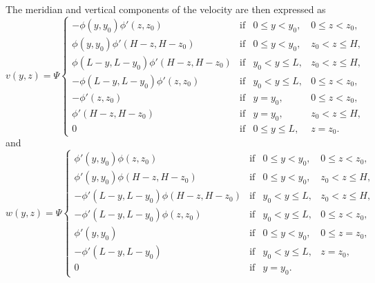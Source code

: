 The meridian and vertical components of the velocity are then expressed as
\begin{equation} \label{eq:v_overturner}
	v(y,z) = \Psi\left\{ 
		\begin{array}{lrrr}
			- \phi(y,y_0)\phi'(z,z_0) & \mbox{if} & 0 \le y < y_0, & 0 \le z < z_0,\\
			\phi(y,y_0)\phi'(H-z,H-z_0) & \mbox{if} & 0 \le y < y_0, & z_0 < z \le H,\\
			\phi(L-y,L-y_0)\phi'(H-z,H-z_0) & \mbox{if} & y_0 < y \le L, & z_0 < z \le H,\\
			- \phi(L-y,L-y_0)\phi'(z,z_0) & \mbox{if} & y_0 < y \le L, & 0 \le z < z_0,\\
			- \phi'(z,z_0) & \mbox{if} & y = y_0, & 0 \le z < z_0,\\
			\phi'(H-z,H-z_0) & \mbox{if} & y = y_0, & z_0 < z \le H,\\
			0 & \mbox{if} &0 \le y \le L, & z = z_0.
		\end{array}
	\right.
\end{equation}
and
\begin{equation} \label{eq:w_overturner}
	w(y,z) = \Psi\left\{ 
		\begin{array}{lrrr}
			\phi'(y,y_0)\phi(z,z_0) & \mbox{if} & 0 \le y < y_0, & 0 \le z < z_0,\\
			\phi'(y,y_0)\phi(H-z,H-z_0) & \mbox{if} & 0 \le y < y_0, & z_0 < z \le H,\\
			- \phi'(L-y,L-y_0)\phi(H-z,H-z_0) & \mbox{if} & y_0 < y \le L, & z_0 < z \le H,\\
			- \phi'(L-y,L-y_0)\phi(z,z_0) & \mbox{if} & y_0 < y \le L, & 0 \le z < z_0,\\
			\phi'(y,y_0) & \mbox{if} & 0 \le y < y_0, & 0 \le z = z_0,\\
			- \phi'(L-y,L-y_0) & \mbox{if} & y_0 < y \le L, & z = z_0,\\
			0 & \mbox{if} & y = y_0. &
		\end{array}
	\right.
\end{equation}
